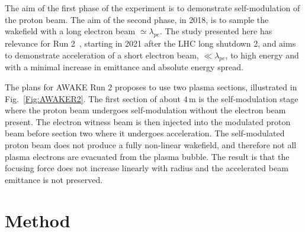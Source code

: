 \documentclass[aps,prstab,reprint,amsmath,amssymb,groupedaddress]{revtex4-1}
\newcommand{\unit}[1]{\,\mathrm{#1}}
\begin{document}
The aim of the first phase of the experiment is to demonstrate self-modulation of the proton beam. The aim of the second
phase, in 2018, is to sample the wakefield with a long electron beam $\simeq\lambda_{pe}$. The study presented here has
relevance for Run 2~\cite{adli:2016}, starting in 2021 after the LHC long shutdown 2, and aims to demonstrate
acceleration of a short electron beam, $\ll\lambda_{pe}$, to high energy and with a minimal increase in emittance and
absolute energy spread.

The plans for AWAKE Run 2 proposes to use two plasma sections, illustrated in Fig.~\ref{Fig:AWAKER2}. The first
section of about $4\unit{m}$ is the self-modulation stage where the proton beam undergoes self-modulation without the
electron beam present. The electron witness beam is then injected into the modulated proton beam before section two
where it undergoes acceleration. The self-modulated proton beam does not produce a fully non-linear wakefield, and
therefore not all plasma electrons are evacuated from the plasma bubble. The result is that the focusing force does not
increase linearly with radius and the accelerated beam emittance is not preserved. 




\section[\label{S:M}]{Method}
\end{document}
